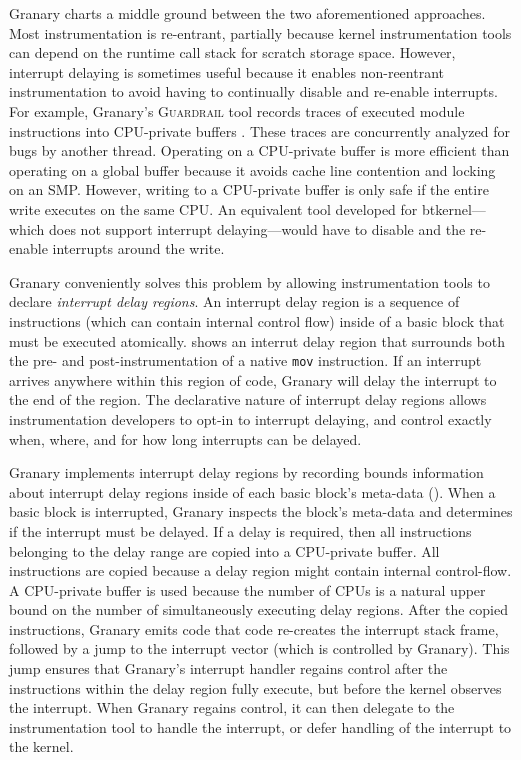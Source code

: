 \documentclass[preprint]{sigplanconf}
\newcommand{\toolname}[1]{{\scshape #1}}
\begin{document}
Granary charts a middle ground between the two aforementioned approaches. Most instrumentation is re-entrant, partially because kernel instrumentation tools can depend on the runtime call stack for scratch storage space. However, interrupt delaying is sometimes useful because it enables non-reentrant instrumentation to avoid having to continually disable and re-enable interrupts. For example, Granary's \toolname{Guardrail} tool records traces of executed module instructions into CPU-private buffers \cite{Guardrail}. These traces are concurrently analyzed for bugs by another thread. Operating on a CPU-private buffer is more efficient than operating on a global buffer because it avoids cache line contention and locking on an SMP. However, writing to a CPU-private buffer is only safe if the entire write executes on the same CPU. An equivalent tool developed for btkernel---which does not support interrupt delaying---would have to disable and the re-enable interrupts around the write. 

Granary conveniently solves this problem by allowing instrumentation tools to declare \emph{interrupt delay regions}. An interrupt delay region is a sequence of instructions (which can contain internal control flow) inside of a basic block that must be executed atomically.  shows an interrut delay region that surrounds both the pre- and post-instrumentation of a native \texttt{mov} instruction. If an interrupt arrives anywhere within this region of code, Granary will delay the interrupt to the end of the region. The declarative nature of interrupt delay regions allows instrumentation developers to opt-in to interrupt delaying, and control exactly when, where, and for how long interrupts can be delayed.

Granary implements interrupt delay regions by recording bounds information about interrupt delay regions inside of each basic block's meta-data (). When a basic block is interrupted, Granary inspects the block's meta-data and determines if the interrupt must be delayed. If a delay is required, then all instructions belonging to the delay range are copied into a CPU-private buffer. All instructions are copied because a delay region might contain internal control-flow. A CPU-private buffer is used because the number of CPUs is a natural upper bound on the number of simultaneously executing delay regions. After the copied instructions, Granary emits code that code re-creates the interrupt stack frame, followed by a jump to the interrupt vector (which is controlled by Granary). This jump ensures that Granary's interrupt handler regains control after the instructions within the delay region fully execute, but before the kernel observes the interrupt. When Granary regains control, it can then delegate to the instrumentation tool to handle the interrupt, or defer handling of the interrupt to the kernel.
\end{document}
